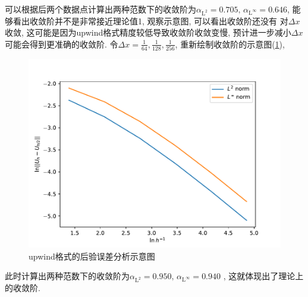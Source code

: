 \documentclass[a4paper,zihao=5,UTF8]{ctexart}
\newcommand{\mr}[1]{\mathrm{#1}}
\begin{document}
	可以根据后两个数据点计算出两种范数下的收敛阶为$\alpha_{\mr{L}^{2}} = 0.705,\,\alpha_{\mr{L}^{\infty}} = 0.646$, 能够看出收敛阶并不是非常接近理论值1, 观察示意图, 可以看出收敛阶还没有
	对$\Delta x$收敛, 这可能是因为upwind格式精度较低导致收敛阶收敛变慢, 
	预计进一步减小$\Delta x$可能会得到更准确的收敛阶. 令$\Delta x = \frac{1}{64}, \frac{1}{128}, \frac{1}{256}$, 重新绘制收敛阶的示意图(\ref{3-1-upwind-new}), 
	\begin{figure}[htbp]
		\centering
		\includegraphics[scale=0.7]{3_1_error_new.pdf}
		\caption{upwind格式的后验误差分析示意图}
		\label{3-1-upwind-new}
	\end{figure}
	此时计算出两种范数下的收敛阶为$\alpha_{\mr{L}^{2}} = 0.950,\,\alpha_{\mr{L}^{\infty}} = 0.940$
	, 这就体现出了理论上的收敛阶.
\end{document}

